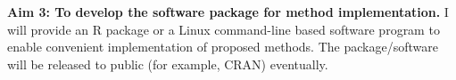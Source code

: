 \documentclass[12pt]{article}
\begin{document}


\textbf{Aim 3: To develop the software package for method implementation.}
I will provide an R package or a Linux command-line based software program to enable convenient implementation of proposed methods. The package/software will be released to public (for example, CRAN) eventually.
\end{document}
